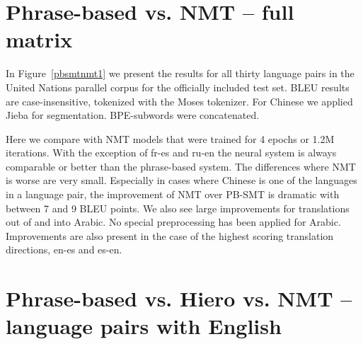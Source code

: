 \documentclass[11pt]{article}
\begin{document}
\section{Phrase-based vs. NMT -- full matrix}
In Figure~\ref{pbsmtnmt1} we present the results for all thirty language pairs in the United Nations parallel corpus for the officially included test set. BLEU results are case-insensitive, tokenized with the Moses tokenizer. For Chinese we applied Jieba for segmentation. BPE-subwords were concatenated. 

Here we compare with NMT models that were trained for 4 epochs or 1.2M iterations. With the exception of fr-es and ru-en the neural system is always comparable or better than the phrase-based system. The differences where NMT is worse are very small. Especially in cases where Chinese is one of the languages in a language pair, the improvement of NMT over PB-SMT is dramatic with between 7 and 9 BLEU points. 
We also see large improvements for translations out of and into Arabic. No special preprocessing has been applied for Arabic. Improvements are also present in the case of the highest scoring translation directions, en-es and es-en.

\section{Phrase-based vs. Hiero vs. NMT -- language pairs with English}
\end{document}
